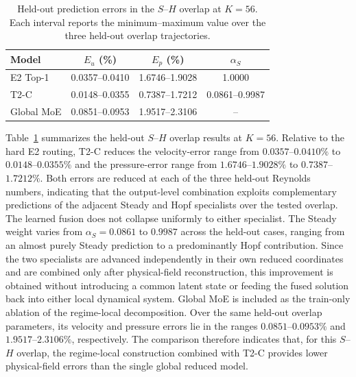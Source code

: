 \begin{table}[htbp]
\centering
\caption{Held-out prediction errors in the $S$--$H$ overlap at $K=56$.
Each interval reports the minimum--maximum value over the three held-out
overlap trajectories.}
\label{tab:cylinder_sh_boundary}

\scriptsize
\setlength{\tabcolsep}{6pt}
\begin{tabular}{@{}lccc@{}}
\toprule
Model
& $E_u$ (\%)
& $E_p$ (\%)
& $\alpha_S$ \\
\midrule

E2 Top-1
& 0.0357--0.0410
& 1.6746--1.9028
& 1.0000 \\

T2-C
& 0.0148--0.0355
& 0.7387--1.7212
& 0.0861--0.9987 \\

Global MoE
& 0.0851--0.0953
& 1.9517--2.3106
& -- \\

\bottomrule
\end{tabular}
\end{table}
Table~\ref{tab:cylinder_sh_boundary} summarizes the held-out
$S$--$H$ overlap results at $K=56$. Relative to the hard E2 routing,
T2-C reduces the velocity-error range from
$0.0357$--$0.0410\%$ to $0.0148$--$0.0355\%$ and the
pressure-error range from $1.6746$--$1.9028\%$ to
$0.7387$--$1.7212\%$. Both errors are reduced at each of the three
held-out Reynolds numbers, indicating that the output-level combination
exploits complementary predictions of the adjacent Steady and Hopf
specialists over the tested overlap. The learned fusion does not collapse uniformly to either specialist.
The Steady weight varies from $\alpha_S=0.0861$ to $0.9987$ across the
held-out cases, ranging from an almost purely Steady prediction to a
predominantly Hopf contribution. Since the two specialists are advanced
independently in their own reduced coordinates and are combined only after
physical-field reconstruction, this improvement is obtained without
introducing a common latent state or feeding the fused solution back into
either local dynamical system. Global MoE is included as the train-only ablation of the regime-local
decomposition. Over the same held-out overlap parameters, its velocity and
pressure errors lie in the ranges $0.0851$--$0.0953\%$ and
$1.9517$--$2.3106\%$, respectively. The comparison therefore indicates
that, for this $S$--$H$ overlap, the regime-local construction combined
with T2-C provides lower physical-field errors than the single global
reduced model.

